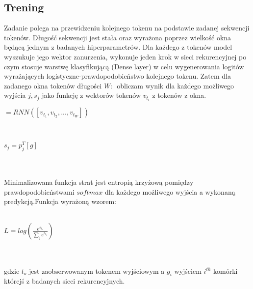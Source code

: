 \subsection{Trening}
Zadanie polega na przewidzeniu kolejnego tokenu na podstawie zadanej sekwencji tokenów. Długość sekwencji jest stała oraz wyrażona poprzez wielkość okna będącą jednym z badanych hiperparametrów. 
Dla każdego z tokenów model wyszukuje jego wektor zanurzenia, wykonuje jeden krok w sieci rekurencyjnej po czym stosuje warstwę klasyfikującą 
(Dense layer) w celu wygenerowania logitów wyrażających logistyczne-prawdopodobieństwo kolejnego tokenu. Zatem dla zadanego okna tokenów długości \begin{math}W\end{math}:
\begin{math}[t_1, t_2, ... t_W]\end{math} obliczam wynik dla każdego możliwego wyjścia \begin{math}j, s_j\end{math} jako funkcję z wektorów tokenów \begin{math}v_{t_i}\end{math}
z tokenów z okna.
\\
\centerline{\begin{math}[g_1, g_2, ..., g_W] = RNN([v_{t_1}, v_{t_2}, ..., v_{t_W}])\end{math}}\\
\centerline{\begin{math}s_j=p_{j}^{T}[g]\end{math}} \\\\
Minimalizowana funkcja strat jest entropią krzyżową pomiędzy prawdopodobieństwami \begin{math}softmax\end{math} dla każdego możliwego wyjścia 
a wykonaną predykcją.Funkcja wyrażoną wzorem: \\\\
\centerline{\begin{math}L = log(\frac{e^{s_{t_o}}}{\sum_{j}e^{s_{t_j}}})\end{math}}\\\\
gdzie \begin{math}t_o\end{math} jest zaobserwowanym tokenem wyjściowym a \begin{math}g_i\end{math} wyjściem \begin{math}i^{th}\end{math} komórki
którejś z badanych sieci rekurencyjnych. 

